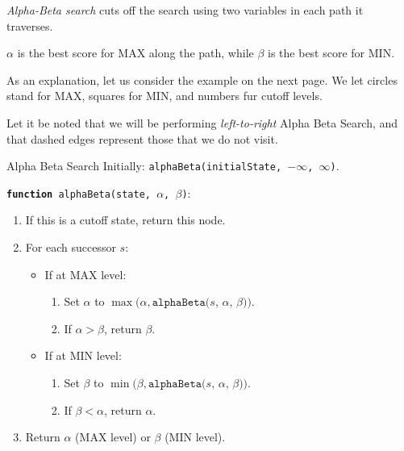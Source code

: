 \documentclass[english]{panikzettel}
\begin{document}
\begin{minipage}[t]{0.425\textwidth}
\emph{Alpha-Beta search} cuts off the search using two variables in each path it traverses.

$\alpha$ is the best score for MAX along the path, while $\beta$ is the best score for MIN.

As an explanation, let us consider the example on the next page. We let circles stand for MAX, squares for MIN, and numbers fur cutoff levels.

Let it be noted that we will be performing \emph{left-to-right} Alpha Beta Search, and that dashed edges represent those that we do not visit.

\end{minipage}\hspace{0.025\textwidth}%
\begin{minipage}[t]{0.55\textwidth}
\vspace{-\baselineskip}
\begin{algo}{Alpha Beta Search}
Initially: \texttt{alphaBeta(initialState, $-\infty$, $\infty$)}.
\medskip

\texttt{\textbf{function} alphaBeta(state, $\alpha$, $\beta$)}:
\begin{enumerate}
    \item If this is a cutoff state, return this node.
    \item For each successor $s$:
        \begin{itemize}
            \item If at MAX level:
                \begin{enumerate}
                    \item Set $\alpha$ to $\max(\alpha, \texttt{alphaBeta($s$, $\alpha$, $\beta$))}$.
                    \item If $\alpha > \beta$, return $\beta$.
                \end{enumerate}
            \item If at MIN level:
                \begin{enumerate}
                    \item Set $\beta$ to $\min(\beta, \texttt{alphaBeta($s$, $\alpha$, $\beta$))}$.
                    \item If $\beta < \alpha$, return $\alpha$.
                \end{enumerate}
        \end{itemize}
    \item Return $\alpha$ (MAX level) or $\beta$ (MIN level).
\end{enumerate}
\end{algo}
\end{minipage}
\end{document}
